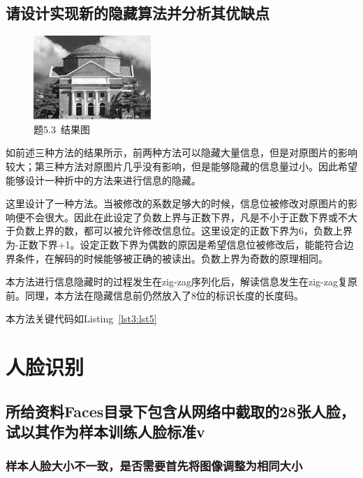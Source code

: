 \documentclass[a4paper]{article}
\begin{document}
		\subsection{请设计实现新的隐藏算法并分析其优缺点}
		
		\begin{figure}[h]
			\centering
			\includegraphics[width = .3\textwidth]{../source/3.3/myselfhidden.jpg}		
			\caption{题5.3~结果图}
			\label{fig11}
		\end{figure}
		
		如前述三种方法的结果所示，前两种方法可以隐藏大量信息，但是对原图片的影响较大；第三种方法对原图片几乎没有影响，但是能够隐藏的信息量过小。因此希望能够设计一种折中的方法来进行信息的隐藏。
		
		这里设计了一种方法。当被修改的系数足够大的时候，信息位被修改对原图片的影响便不会很大。因此在此设定了负数上界与正数下界，凡是不小于正数下界或不大于负数上界的数，都可以被允许修改信息位。这里设定的正数下界为6，负数上界为-正数下界+1。设定正数下界为偶数的原因是希望信息位被修改后，能能符合边界条件，在解码的时候能够被正确的被读出。负数上界为奇数的原理相同。
		
		本方法进行信息隐藏时的过程发生在zig-zag序列化后，解读信息发生在zig-zag复原前。同理，本方法在隐藏信息前仍然放入了8位的标识长度的长度码。
		
		本方法关键代码如Listing~\ref{lst3:lst5}
		
		
		\section{人脸识别}
		
		\subsection{所给资料Faces目录下包含从网络中截取的28张人脸，试以其作为样本训练人脸标准v}
		\subsubsection{样本人脸大小不一致，是否需要首先将图像调整为相同大小}
		
\end{document}
